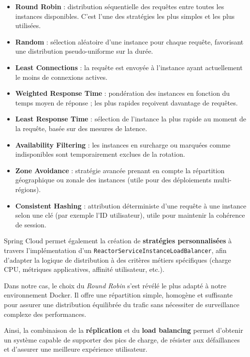 \begin{itemize}
    \item \textbf{Round Robin} : distribution séquentielle des requêtes entre toutes les instances disponibles. C'est l'une des stratégies les plus simples et les plus utilisées.
    \item \textbf{Random} : sélection aléatoire d'une instance pour chaque requête, favorisant une distribution pseudo-uniforme sur la durée.
    \item \textbf{Least Connections} : la requête est envoyée à l'instance ayant actuellement le moins de connexions actives.
    \item \textbf{Weighted Response Time} : pondération des instances en fonction du temps moyen de réponse ; les plus rapides reçoivent davantage de requêtes.
    \item \textbf{Least Response Time} : sélection de l'instance la plus rapide au moment de la requête, basée sur des mesures de latence.
    \item \textbf{Availability Filtering} : les instances en surcharge ou marquées comme indisponibles sont temporairement exclues de la rotation.
    \item \textbf{Zone Avoidance} : stratégie avancée prenant en compte la répartition géographique ou zonale des instances (utile pour des déploiements multi-régions).
    \item \textbf{Consistent Hashing} : attribution déterministe d'une requête à une instance selon une clé (par exemple l'ID utilisateur), utile pour maintenir la cohérence de session.
\end{itemize}

Spring Cloud permet également la création de \textbf{stratégies personnalisées} à travers l'implémentation d'un \texttt{ReactorServiceInstanceLoadBalancer}, afin d'adapter la logique de distribution à des critères métiers spécifiques (charge CPU, métriques applicatives, affinité utilisateur, etc.).

Dans notre cas, le choix du \textit{Round Robin} s'est révélé le plus adapté à notre environnement Docker. Il offre une répartition simple, homogène et suffisante pour assurer une distribution équilibrée du trafic sans nécessiter de surveillance complexe des performances.

Ainsi, la combinaison de la \textbf{réplication} et du \textbf{load balancing} permet d'obtenir un système capable de supporter des pics de charge, de résister aux défaillances et d'assurer une meilleure expérience utilisateur.


